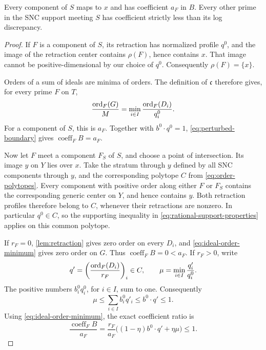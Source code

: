 \begin{lemma}
\label{lem:isolated-equality}
Every component of $S$ maps to $x$ and has coefficient $a_F$ in $B$.  Every other prime in the SNC support meeting $S$ has coefficient strictly less than its log discrepancy.
\end{lemma}

\begin{proof}
If $F$ is a component of $S$, its retraction has normalized profile $q^0$, and the image of the retraction center contains $\rho(F)$, hence contains $x$.  That image cannot be positive-dimensional by our choice of $q^0$.  Consequently $\rho(F)=\{x\}$.

Orders of a sum of ideals are minima of orders.  The definition of $\mathfrak{c}$ therefore gives, for every prime $F$ on $T$,
\begin{equation}
 \frac{\operatorname{ord}_F(G)}{M}
   =\min_{i\in I}\frac{\operatorname{ord}_F(D_i)}{q_i^0}.
 \label{eq:ideal-order-minimum}
\end{equation}
For a component of $S$, this is $a_F$.  Together with $b^0\cdot q^0=1$, \eqref{eq:perturbed-boundary} gives $\operatorname{coeff}_F B=a_F$.

Now let $F$ meet a component $F_S$ of $S$, and choose a point of intersection.  Its image $y$ on $Y$ lies over $x$. Take the stratum through $y$ defined by all SNC components through $y$, and the corresponding polytope $C$ from \eqref{eq:order-polytopes}.  Every component with positive order along either $F$ or $F_S$ contains the corresponding generic center on $Y$, and hence contains $y$.  Both retraction profiles therefore belong to $C$, whenever their retractions are nonzero. In particular $q^0\in C$, so the supporting inequality in \eqref{eq:rational-support-properties} applies on this common polytope.

If $r_F=0$, \cref{lem:retraction} gives zero order on every $D_i$, and \eqref{eq:ideal-order-minimum} gives zero order on $G$.  Thus $\operatorname{coeff}_F B=0<a_F$.  If $r_F>0$, write
\[
 q'=\left(\frac{\operatorname{ord}_F(D_i)}{r_F}\right)_i\in C,
 \qquad \mu=\min_{i\in I}\frac{q'_i}{q_i^0}.
\]
The positive numbers $b_i^0q_i^0$, for $i\in I$, sum to one. Consequently
\begin{equation}
 \mu\leq\sum_{i\in I}b_i^0q'_i
       \leq b^0\cdot q'\leq1.
 \label{eq:rigid-minimum-inequality}
\end{equation}
Using \eqref{eq:ideal-order-minimum}, the exact coefficient ratio is
\begin{equation}
 \frac{\operatorname{coeff}_F B}{a_F}
   =\frac{r_F}{a_F}
       \bigl((1-\eta)b^0\cdot q'+\eta\mu\bigr)
   \leq1.
 \label{eq:boundary-discrepancy-ratio}
\end{equation}


\end{proof}
